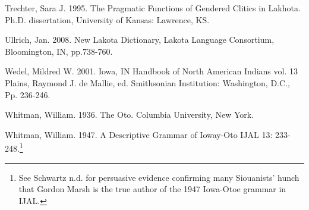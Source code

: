 \documentclass[output=paper]{LSP/langsci}
\begin{document}
\begin{reflist}
Trechter, Sara J.  1995.  The Pragmatic Functions of Gendered Clitics in Lakhota.  Ph.D. dissertation,  University of Kansas: Lawrence, KS.  			  				 
 
Ullrich, Jan. 2008. New Lakota Dictionary, Lakota Language Consortium, Bloomington, IN, pp.738-760.  
 
Wedel, Mildred W.  2001. Iowa, IN Handbook of North American Indians vol. 13 Plains,  Raymond J. de Mallie, ed.  Smithsonian Institution:  Washington, D.C., Pp. 236-246. 
 
Whitman, William. 1936.  The Oto.  Columbia University, New York. 	       	         
 
Whitman, William. 1947.  A Descriptive Grammar of Ioway-Oto IJAL 13: 233-248.\footnote{See Schwartz n.d. for persuasive evidence confirming many Siouanists' hunch that Gordon Marsh is the true author of the 1947 Iowa-Otoe grammar in IJAL.}

\end{reflist}
\end{document}
